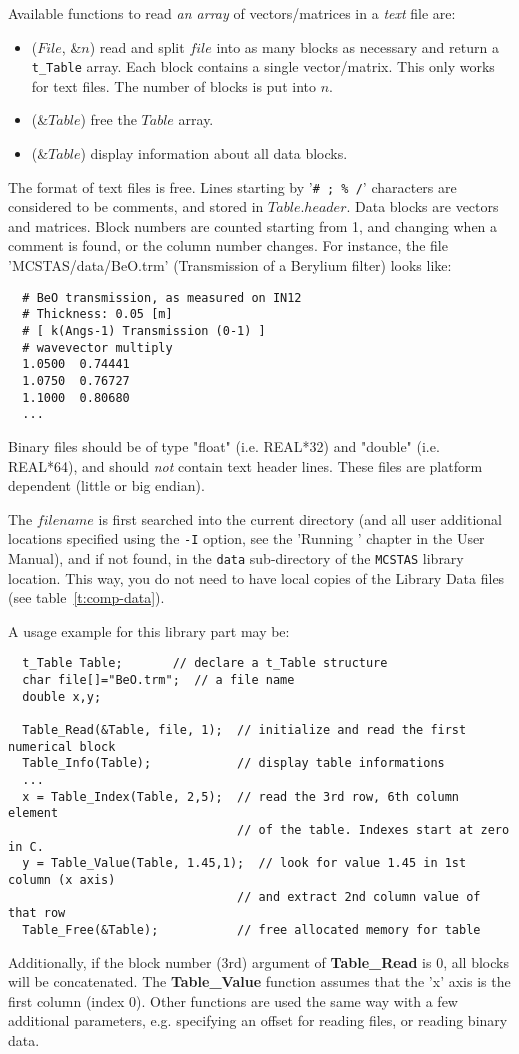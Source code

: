 Available functions to read \emph{an array} of vectors/matrices in a \emph{text} file are:
\begin{itemize}
\item {}($File$, \&$n$) read and split $file$
into as many blocks as necessary and return a \verb+t_Table+ array.
Each block contains a single vector/matrix. This only works for text files.
The number of blocks is put into $n$.
\item {}(\&$Table$) free the $Table$ array.
\item {}(\&$Table$) display information about all data blocks.
\end{itemize}

The format of text files is free. Lines starting by '\verb+# ; % /+' characters are considered to be comments, and stored in $Table.header$. Data blocks are vectors and matrices. Block numbers are counted starting from 1, and changing when a comment is found, or the column number changes. For instance, the file 'MCSTAS/data/BeO.trm' (Transmission of a Berylium filter) looks like:
\begin{lstlisting}
  # BeO transmission, as measured on IN12
  # Thickness: 0.05 [m]
  # [ k(Angs-1) Transmission (0-1) ]
  # wavevector multiply
  1.0500  0.74441
  1.0750  0.76727
  1.1000  0.80680
  ...
\end{lstlisting}
Binary files should be of type "float" (i.e. REAL*32) and "double" (i.e. REAL*64),
and should \emph{not} contain text header lines. These files are platform
dependent (little or big endian).

The $filename$ is first searched into the current directory (and all user additional locations specified using the \verb+-I+ option, see the 'Running \MCS ' chapter in the User Manual), and if not found, in the \verb+data+ sub-directory of the \verb+MCSTAS+ library location. 
 This way, you do not need to have local copies of the \MCS Library Data files (see table~\ref{t:comp-data}).

A usage example for this library part may be:
\begin{lstlisting}
  t_Table Table;       // declare a t_Table structure
  char file[]="BeO.trm";  // a file name
  double x,y;

  Table_Read(&Table, file, 1);  // initialize and read the first numerical block
  Table_Info(Table);            // display table informations
  ...
  x = Table_Index(Table, 2,5);  // read the 3rd row, 6th column element
                                // of the table. Indexes start at zero in C.
  y = Table_Value(Table, 1.45,1);  // look for value 1.45 in 1st column (x axis)
                                // and extract 2nd column value of that row
  Table_Free(&Table);           // free allocated memory for table
\end{lstlisting}
Additionally, if the block number (3rd) argument of  \textbf{Table\_Read} is 0, all blocks will be concatenated.
The \textbf{Table\_Value} function assumes that the 'x' axis is the first column (index 0).
Other functions are used the same way with a few additional parameters, e.g. specifying an offset for reading files, or reading binary data.


